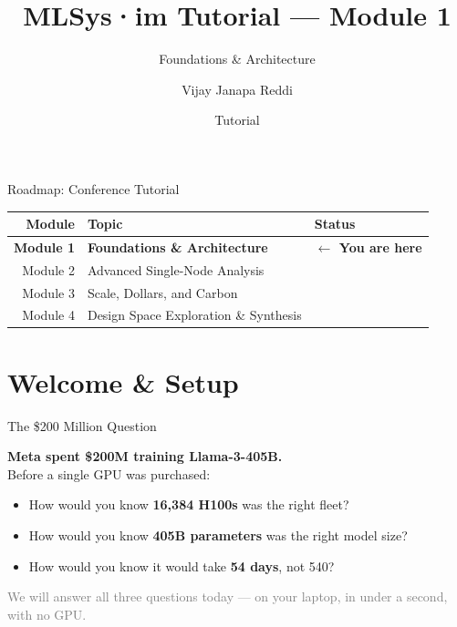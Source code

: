 \documentclass[aspectratio=169, 12pt]{beamer}
\title{MLSys·im Tutorial --- Module 1}
\subtitle{Foundations \& Architecture}
\author{Vijay Janapa Reddi}
\institute{Harvard University}
\date{Tutorial}
\begin{document}
\begin{frame}[shrink]{Roadmap: Conference Tutorial}
\centering\small
\begin{tabular}{rll}
\toprule
\textbf{Module} & \textbf{Topic} & \textbf{Status} \\
\midrule
\rowcolor{crimson!12}
\textbf{Module 1} & \textbf{Foundations \& Architecture} & \textbf{$\leftarrow$ You are here} \\
Module 2 & Advanced Single-Node Analysis & \\
Module 3 & Scale, Dollars, and Carbon & \\
Module 4 & Design Space Exploration \& Synthesis & \\
\bottomrule
\end{tabular}
\end{frame}


\section{Welcome \& Setup}

\begin{frame}[shrink]
\titlepage
\end{frame}

\begin{frame}[shrink]{The \$200 Million Question}

\centering
\Large
\textbf{Meta spent \$200M training Llama-3-405B.}\\[1cm]

\normalsize
Before a single GPU was purchased:\\[0.3cm]
\begin{itemize}
  \item How would you know \textbf{16,384 H100s} was the right fleet?
  \item How would you know \textbf{405B parameters} was the right model size?
  \item How would you know it would take \textbf{54 days}, not 540?
\end{itemize}

\vfill
\small\textcolor{gray}{We will answer all three questions today --- on your laptop, in under a second, with no GPU.}
\end{frame}
\end{document}
